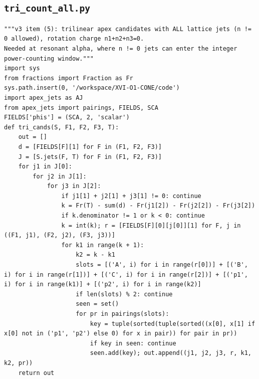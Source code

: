 \documentclass[10pt]{article}
\begin{document}
\subsection{\texttt{tri\_count\_all.py}}
\begin{lstlisting}
"""v3 item (5): trilinear apex candidates with ALL lattice jets (n != 0 allowed), rotation charge n1+n2+n3=0.
Needed at resonant alpha, where n != 0 jets can enter the integer power-counting window."""
import sys
from fractions import Fraction as Fr
sys.path.insert(0, '/workspace/XVI-O1-CONE/code')
import apex_jets as AJ
from apex_jets import pairings, FIELDS, SCA
FIELDS['phis'] = (SCA, 2, 'scalar')
def tri_cands(S, F1, F2, F3, T):
    out = []
    d = [FIELDS[F][1] for F in (F1, F2, F3)]
    J = [S.jets(F, T) for F in (F1, F2, F3)]
    for j1 in J[0]:
        for j2 in J[1]:
            for j3 in J[2]:
                if j1[1] + j2[1] + j3[1] != 0: continue
                k = Fr(T) - sum(d) - Fr(j1[2]) - Fr(j2[2]) - Fr(j3[2])
                if k.denominator != 1 or k < 0: continue
                k = int(k); r = [FIELDS[F][0][j[0]][1] for F, j in ((F1, j1), (F2, j2), (F3, j3))]
                for k1 in range(k + 1):
                    k2 = k - k1
                    slots = [('A', i) for i in range(r[0])] + [('B', i) for i in range(r[1])] + [('C', i) for i in range(r[2])] + [('p1', i) for i in range(k1)] + [('p2', i) for i in range(k2)]
                    if len(slots) % 2: continue
                    seen = set()
                    for pr in pairings(slots):
                        key = tuple(sorted(tuple(sorted((x[0], x[1] if x[0] not in ('p1', 'p2') else 0) for x in pair)) for pair in pr))
                        if key in seen: continue
                        seen.add(key); out.append((j1, j2, j3, r, k1, k2, pr))
    return out
\end{lstlisting}
\end{document}
